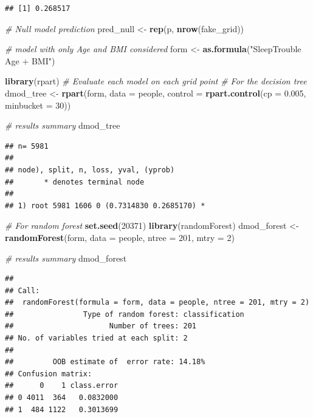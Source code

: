 \documentclass[]{article}
\newenvironment{Shaded}{\begin{snugshade}}{\end{snugshade}}
\newcommand{\KeywordTok}[1]{\textcolor[rgb]{0.13,0.29,0.53}{\textbf{{#1}}}}
\newcommand{\DataTypeTok}[1]{\textcolor[rgb]{0.13,0.29,0.53}{{#1}}}
\newcommand{\DecValTok}[1]{\textcolor[rgb]{0.00,0.00,0.81}{{#1}}}
\newcommand{\FloatTok}[1]{\textcolor[rgb]{0.00,0.00,0.81}{{#1}}}
\newcommand{\StringTok}[1]{\textcolor[rgb]{0.31,0.60,0.02}{{#1}}}
\newcommand{\CommentTok}[1]{\textcolor[rgb]{0.56,0.35,0.01}{\textit{{#1}}}}
\newcommand{\NormalTok}[1]{{#1}}
\begin{document}
\begin{verbatim}
## [1] 0.268517
\end{verbatim}

\begin{Shaded}
\begin{Highlighting}[]
\CommentTok{# Null model prediction}
\NormalTok{pred_null <-}\StringTok{ }\KeywordTok{rep}\NormalTok{(p, }\KeywordTok{nrow}\NormalTok{(fake_grid))}

\CommentTok{# model with only Age and BMI considered}
\NormalTok{form <-}\StringTok{ }\KeywordTok{as.formula}\NormalTok{(}\StringTok{"SleepTrouble ~ Age + BMI"}\NormalTok{)}

\KeywordTok{library}\NormalTok{(rpart)}
\CommentTok{# Evaluate each model on each grid point}
\CommentTok{# For the decision tree}
\NormalTok{dmod_tree <-}\StringTok{ }\KeywordTok{rpart}\NormalTok{(form, }\DataTypeTok{data =} \NormalTok{people, }
                   \DataTypeTok{control =} \KeywordTok{rpart.control}\NormalTok{(}\DataTypeTok{cp =} \FloatTok{0.005}\NormalTok{, }\DataTypeTok{minbucket =} \DecValTok{30}\NormalTok{))}

\CommentTok{# results summary}
\NormalTok{dmod_tree}
\end{Highlighting}
\end{Shaded}

\begin{verbatim}
## n= 5981 
## 
## node), split, n, loss, yval, (yprob)
##       * denotes terminal node
## 
## 1) root 5981 1606 0 (0.7314830 0.2685170) *
\end{verbatim}

\begin{Shaded}
\begin{Highlighting}[]
\CommentTok{# For random forest}
\KeywordTok{set.seed}\NormalTok{(}\DecValTok{20371}\NormalTok{)}
\KeywordTok{library}\NormalTok{(randomForest)}
\NormalTok{dmod_forest <-}\StringTok{ }\KeywordTok{randomForest}\NormalTok{(form, }\DataTypeTok{data =} \NormalTok{people, }
                     \DataTypeTok{ntree =} \DecValTok{201}\NormalTok{, }\DataTypeTok{mtry =} \DecValTok{2}\NormalTok{)}

\CommentTok{# results summary}
\NormalTok{dmod_forest}
\end{Highlighting}
\end{Shaded}

\begin{verbatim}
## 
## Call:
##  randomForest(formula = form, data = people, ntree = 201, mtry = 2) 
##                Type of random forest: classification
##                      Number of trees: 201
## No. of variables tried at each split: 2
## 
##         OOB estimate of  error rate: 14.18%
## Confusion matrix:
##      0    1 class.error
## 0 4011  364   0.0832000
## 1  484 1122   0.3013699
\end{verbatim}
\end{document}
